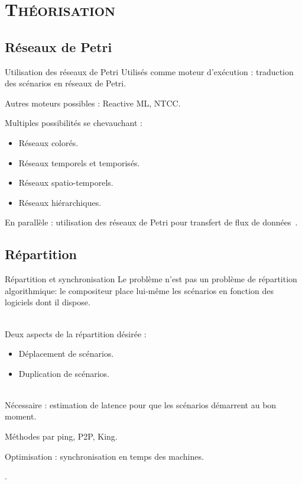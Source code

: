 \section{\scshape Théorisation}
\subsection{Réseaux de Petri}
\begin{frame}{Utilisation des réseaux de Petri}
Utilisés comme moteur d'exécution : traduction des scénarios en réseaux de Petri\cite{allombert2009aspects}.

Autres moteurs possibles : Reactive ML\cite{arias2014executing}, NTCC\cite{allombert2006concurrent}.

Multiples possibilités se chevauchant :
\begin{itemize}
	\item Réseaux colorés.
	\item Réseaux temporels et temporisés.
	\item Réseaux spatio-temporels.
	\item Réseaux hiérarchiques.
\end{itemize}

En parallèle : utilisation des réseaux de Petri pour transfert de flux de données~\cite{arias2014modelling}.
\end{frame}

\subsection{Répartition}
\begin{frame}{Répartition et synchronisation}
	Le problème n'est pas un problème de répartition algorithmique:
	le compositeur place lui-même les scénarios en fonction des logiciels dont il dispose.
	
	~ \\
	Deux aspects de la répartition désirée : 
	\begin{itemize}
		\item Déplacement de scénarios.
		\item Duplication de scénarios. 
	\end{itemize}
	~ \\
	Nécessaire : estimation de latence pour que les scénarios démarrent au bon moment.
	\begin{itemize}
		\itemar Méthodes par ping, P2P\cite{im2000method}, King\cite{gummadi2002king}.
	\end{itemize}
	
	Optimisation : synchronisation en temps des machines.
	\begin{itemize}
		\itemar{Protocoles \textsc{PTP}\cite{scheiterer2009synchronization}, \textsc{NTP}\cite{mills1991internet}}.
	\end{itemize}
\end{frame}
